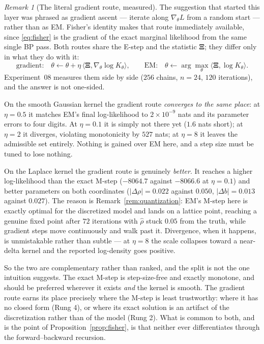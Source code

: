 \documentclass[11pt]{article}
\theoremstyle{remark}
\newtheorem{remark}{Remark}
\newcommand{\Xibf}{\bm{\Xi}}
\begin{document}
\begin{remark}[The literal gradient route, measured]
\label{rem:gradient-route}
The suggestion that started this layer was phrased as gradient ascent --- iterate
along $\nabla_\theta L$ from a random start --- rather than as EM. Fisher's
identity makes that route immediately available, since \eqref{eq:fisher} is the
gradient of the exact marginal likelihood from the same single BP pass. Both
routes share the E-step and the statistic $\Xibf$; they differ only in what they
do with it:
\begin{equation}
  \text{gradient:}\quad \theta \leftarrow \theta + \eta\,\langle\Xibf, \nabla_\theta\log K_\theta\rangle,
  \qquad
  \text{EM:}\quad \theta \leftarrow \arg\max_\theta \langle\Xibf, \log K_\theta\rangle .
\end{equation}
Experiment~08 measures them side by side ($256$ chains, $n = 24$, $120$
iterations), and the answer is not one-sided.

On the smooth Gaussian kernel the gradient route \emph{converges to the same
place}: at $\eta = 0.5$ it matches EM's final log-likelihood to $2\times10^{-9}$
nats and its parameter errors to four digits. At $\eta = 0.1$ it is simply not
there yet ($1.6$ nats short); at $\eta = 2$ it diverges, violating monotonicity
by $527$ nats; at $\eta = 8$ it leaves the admissible set entirely. Nothing is
gained over EM here, and a step size must be tuned to lose nothing.

On the Laplace kernel the gradient route is genuinely \emph{better}. It reaches
a higher log-likelihood than the exact M-step ($-8064.7$ against $-8066.6$ at
$\eta = 0.1$) and better parameters on both coordinates ($|\Delta\rho| = 0.022$
against $0.050$, $|\Delta b| = 0.013$ against $0.027$). The reason is
Remark~\ref{rem:quantization}: EM's M-step here is exactly optimal for the
discretized model and lands on a lattice point, reaching a genuine fixed point
after $72$ iterations with $\hat\rho$ stuck $0.05$ from the truth, while
gradient steps move continuously and walk past it. Divergence, when it happens,
is unmistakable rather than subtle --- at $\eta = 8$ the scale collapses toward
a near-delta kernel and the reported log-density goes positive.

So the two are complementary rather than ranked, and the split is not the one
intuition suggests. The exact M-step is step-size-free and exactly monotone, and
should be preferred wherever it exists \emph{and} the kernel is smooth. The
gradient route earns its place precisely where the M-step is least trustworthy:
where it has no closed form (Rung 4), or where its exact solution is an artifact
of the discretization rather than of the model (Rung 2). What is common to both,
and is the point of Proposition~\ref{prop:fisher}, is that neither ever
differentiates through the forward--backward recursion.
\end{remark}
\end{document}
